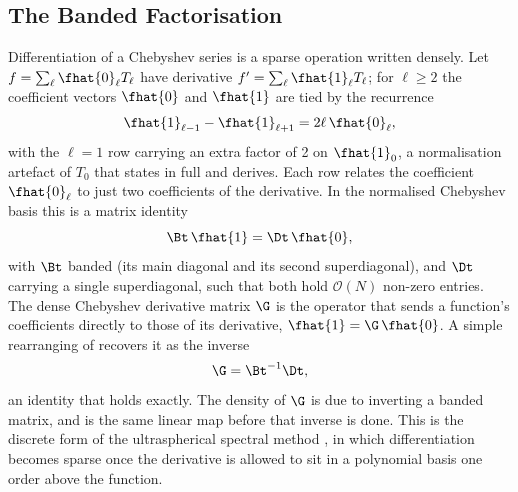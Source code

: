 \subsection{The Banded Factorisation}
\label{sec:descriptor-construction}

Differentiation of a Chebyshev series is a sparse operation written densely. Let $f = \sum_\ell \fhat{0}_\ell T_\ell$ have derivative $f' = \sum_\ell \fhat{1}_\ell T_\ell$; for $\ell \ge 2$ the coefficient vectors $\fhat{0}$ and $\fhat{1}$ are tied by the recurrence
\begin{equation}
    \fhat{1}_{\ell-1} - \fhat{1}_{\ell+1} = 2\ell\,\fhat{0}_\ell ,
    \label{eq:cheb-recurrence}
\end{equation}
with the $\ell = 1$ row carrying an extra factor of 2 on $\fhat{1}_0$, a normalisation artefact of $T_0$ that  states in full and derives. Each row relates the coefficient $\fhat{0}_\ell$ to just two coefficients of the derivative. In the normalised Chebyshev basis this is a matrix identity
\begin{equation}
    \Bt\,\fhat{1} = \Dt\,\fhat{0} ,
    \label{eq:banded-factorisation}
\end{equation}
with $\Bt$ banded (its main diagonal and its second superdiagonal), and $\Dt$ carrying a single superdiagonal, such that both hold $\mathcal{O}(N)$ non-zero entries. The dense Chebyshev derivative matrix $\G$ is the operator that sends a function's coefficients directly to those of its derivative, $\fhat{1} = \G\,\fhat{0}$. A simple rearranging of  recovers it as the inverse
\begin{equation}
    \G = \Bt^{-1}\Dt ,
    \label{eq:G-factorisation}
\end{equation}
an identity that holds exactly. The density of $\G$ is due to inverting a banded matrix, and  is the same linear map before that inverse is done. This is the discrete form of the ultraspherical spectral method \cite{olver2013}, in which differentiation becomes sparse once the derivative is allowed to sit in a polynomial basis one order above the function.

